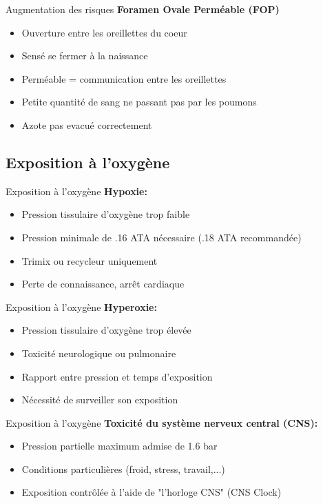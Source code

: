 \begin{frame}{Augmentation des risques}
	\textbf{Foramen Ovale Perméable (FOP) }	
	\begin{itemize}
		\item Ouverture entre les oreillettes du coeur
		\item Sensé se fermer à la naissance
		\item Perméable = communication entre les oreillettes
		\item Petite quantité de sang ne passant pas par les poumons
		\item Azote pas evacué correctement
	\end{itemize}
\end{frame}

\subsection{Exposition à l'oxygène}
	\begin{frame}{Exposition à l'oxygène}  
		\textbf{Hypoxie:}	
		\begin{itemize}
			\item Pression tissulaire d'oxygène trop faible
			\item Pression minimale de .16 ATA nécessaire (.18 ATA recommandée)
			\item Trimix ou recycleur uniquement
			\item Perte de connaissance, arrêt cardiaque
		\end{itemize}
	\end{frame}
	
	\begin{frame}{Exposition à l'oxygène} 
		\textbf{Hyperoxie:}	
		\begin{itemize}
			\item Pression tissulaire d'oxygène trop élevée
			\item Toxicité neurologique ou pulmonaire
			\item Rapport entre pression et temps d'exposition
			\item Nécessité de surveiller son exposition
		\end{itemize}
	\end{frame}

	\begin{frame}{Exposition à l'oxygène}
		\textbf{Toxicité du système nerveux central (CNS):}	
		\begin{itemize}
			\item Pression partielle maximum admise de 1.6 bar
			\item Conditions particulières (froid, stress, travail,...)
			\item Exposition contrôlée à l'aide de "l'horloge CNS" (CNS Clock)
		\end{itemize}
	\end{frame}

